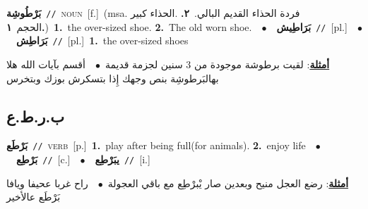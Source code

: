 \documentclass[10pt,a4paper,twoside]{article} %
\begin{document}
\begin{multicols}{2}
{\setlength\topsep{0pt}\textbf{\foreignlanguage{arabic}{بَرْطُوشِة}}\ {\color{gray}\texttt{//}\color{black}}\ \textsc{noun}\ [f.]\ \color{gray}(msa. \foreignlanguage{arabic}{فردة الحذاء القديم البالي.}~\foreignlanguage{arabic}{\textbf{٢.}}  .\foreignlanguage{arabic}{الحذاء كبير الحجم}~\foreignlanguage{arabic}{\textbf{١.}})\color{black}\ \textbf{1.}~the over-sized shoe.  \textbf{2.}~The old worn shoe.\ \ $\bullet$\ \ \setlength\topsep{0pt}\textbf{\foreignlanguage{arabic}{بَرَاطِيش}}\ {\color{gray}\texttt{//}\color{black}}\ [pl.]\ \ $\bullet$\ \ \setlength\topsep{0pt}\textbf{\foreignlanguage{arabic}{بَرَاطِش}}\ {\color{gray}\texttt{//}\color{black}}\ [pl.]\ \textbf{1.}~the over-sized shoes\  \begin{flushright}\color{gray}\foreignlanguage{arabic}{\textbf{\underline{\foreignlanguage{arabic}{أمثلة}}}: لقيت برطوشة موجودة من 3 سنين لجزمة قديمة\ $\bullet$\ \  أقسم بآيات الله هلا بهالبَرطوشِة بنص وجهك إِذا بتسكرش بوزك وبتخرس}\end{flushright}\color{black}} \vspace{2mm}

\vspace{-3mm}
\subsection*{\color{blue}\foreignlanguage{arabic}{ب.ر.ط.ع}\color{blue}{}} 

{\setlength\topsep{0pt}\textbf{\foreignlanguage{arabic}{بَرْطَع}}\ {\color{gray}\texttt{//}\color{black}}\ \textsc{verb}\ [p.]\ \textbf{1.}~play after being full(for animals).  \textbf{2.}~enjoy life\ \ $\bullet$\ \ \setlength\topsep{0pt}\textbf{\foreignlanguage{arabic}{بَرْطِع}}\ {\color{gray}\texttt{//}\color{black}}\ [c.]\ \ $\bullet$\ \ \setlength\topsep{0pt}\textbf{\foreignlanguage{arabic}{يبَرْطِع}}\ {\color{gray}\texttt{//}\color{black}}\ [i.]\  \begin{flushright}\color{gray}\foreignlanguage{arabic}{\textbf{\underline{\foreignlanguage{arabic}{أمثلة}}}: رضع العجل منيح وبعدين صار يْبرْطِع مع باقي العجولة\ $\bullet$\ \  راح غربا عحيفا ويافا بَرْطَع عالأخير}\end{flushright}\color{black}} \vspace{2mm}


\end{multicols}
\end{document}
